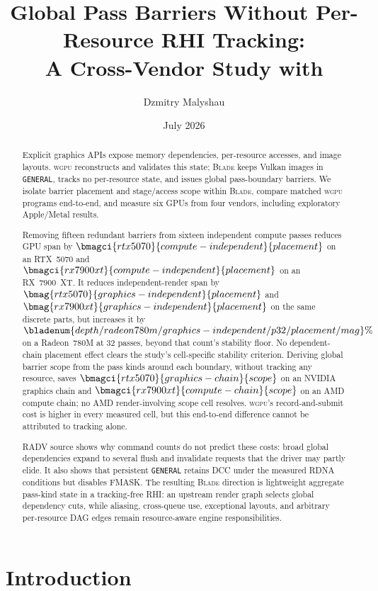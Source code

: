 \documentclass[10pt,twocolumn]{article}
\title{Global Pass Barriers Without Per-Resource RHI Tracking:\\
A Cross-Vendor Study with \blade}
\author{Dzmitry Malyshau}
\date{July 2026}
\newcommand{\blade}{\textsc{Blade}}
\newcommand{\wgpu}{\textsc{wgpu}}
\begin{document}
\maketitle

\begin{abstract}
Explicit graphics APIs expose memory dependencies, per-resource accesses, and
image layouts. \wgpu{} reconstructs and validates this state; \blade{} keeps
Vulkan images in \texttt{GENERAL}, tracks no per-resource state, and issues
global pass-boundary barriers. We isolate barrier placement and stage/access
scope within \blade{}, compare matched \wgpu{} programs end-to-end, and measure
six GPUs from four vendors, including exploratory Apple/Metal results.

Removing fifteen redundant barriers from sixteen independent compute passes
reduces GPU span by $\bmagci{rtx5070}{compute-independent}{placement}$ on an
RTX~5070 and $\bmagci{rx7900xt}{compute-independent}{placement}$ on an
RX~7900~XT. It reduces independent-render span by
$\bmag{rtx5070}{graphics-independent}{placement}$ and
$\bmag{rx7900xt}{graphics-independent}{placement}$ on the same discrete parts,
but increases it by
$\bladenum{depth/radeon780m/graphics-independent/p32/placement/mag}\%$ on a
Radeon~780M at 32 passes, beyond that count's stability floor. No
dependent-chain placement effect clears the study's cell-specific stability
criterion. Deriving global barrier scope from the pass kinds around each
boundary, without tracking any resource, saves
$\bmagci{rtx5070}{graphics-chain}{scope}$ on an NVIDIA graphics chain and
$\bmagci{rx7900xt}{compute-chain}{scope}$ on an AMD compute chain; no AMD
render-involving scope cell resolves. \wgpu's record-and-submit cost is higher
in every measured cell, but this end-to-end difference cannot be attributed
to tracking alone.

RADV source shows why command counts do not predict these costs: broad global
dependencies expand to several flush and invalidate requests that the driver
may partly elide. It also shows that persistent \texttt{GENERAL} retains DCC
under the measured RDNA conditions but disables FMASK. The resulting \blade{}
direction is lightweight aggregate pass-kind state in a tracking-free RHI: an
upstream render graph selects global dependency cuts, while aliasing,
cross-queue use, exceptional layouts, and arbitrary per-resource DAG edges
remain resource-aware engine responsibilities.
\end{abstract}

\section{Introduction}
\end{document}
